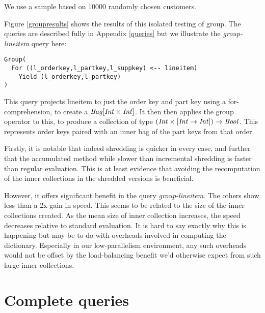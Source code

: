We use a sample based on 10000 randomly chosen customers.

Figure \ref{groupresults} shows the results of this isolated testing of group. The queries are described fully in Appendix \ref{queries} but we illustrate the \textit{group-lineitem} query here:
\vs\begin{lstlisting}
Group(
  For ((l_orderkey,l_partkey,l_suppkey) <-- lineitem)
    Yield (l_orderkey,l_partkey)
)
\end{lstlisting}\vs

This query projects lineitem to just the order key and part key using a for-comprehension, to create a $\textrm{\textit{Bag}}[\textrm{\textit{Int}} \times \textrm{\textit{Int}}]$. It then then applies the group operator to this, to produce a collection of type $(\textrm{\textit{Int}} \times [\textrm{\textit{Int}} \rightarrow \textrm{\textit{Int}}]) \rightarrow \textrm{\textit{Bool}}$. This represents order keys paired with an inner bag of the part keys from that order.

Firstly, it is notable that indeed shredding is quicker in every case, and further that the accumulated method while slower than incremental shredding is faster than regular evaluation. This is at least evidence that avoiding the recomputation of the inner collections in the shredded versions is beneficial.

However, it offers significant benefit in the query \textit{group-lineitem}. The others show less than a 2x gain in speed. This seems to be related to the size of the inner collections created. As the mean size of inner collection increases, the speed decreases relative to standard evaluation. It is hard to say exactly why this is happening but may be to do with overheads involved in computing the dictionary. Especially in our low-parallelism environment, any such overheads would not be offset by the load-balancing benefit we'd otherwise expect from such large inner collections.

\section{Complete queries}

